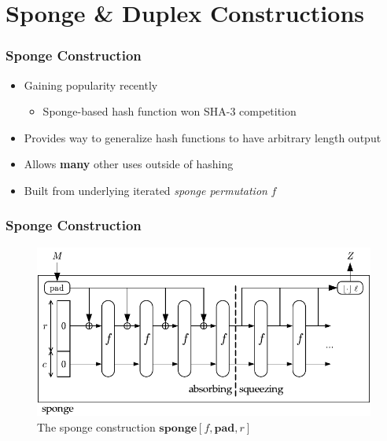 \section{Sponge \& Duplex Constructions}
\begin{frame}
\frametitle{Sponge Construction}
\begin{itemize}
  \item Gaining popularity recently
  \begin{itemize}
    \item Sponge-based \Keccak hash function won SHA-3 competition
  \end{itemize}
  \item Provides way to generalize hash functions to have arbitrary length output
  \item Allows \textbf{many} other uses outside of hashing
  \item Built from underlying iterated \emph{sponge permutation} $f$
\end{itemize}
\end{frame}

\begin{frame}
\frametitle{Sponge Construction}
\begin{figure}[ht]
\centering
\includegraphics[width=\textwidth]{img/Sponge.pdf}
\caption{The sponge construction $\mathbf{sponge}[f,\mathbf{pad},r]$ \cite{Bertoni2011_SpongeFunctions}}
\label{fig:Sponge}
\end{figure}
\end{frame}

